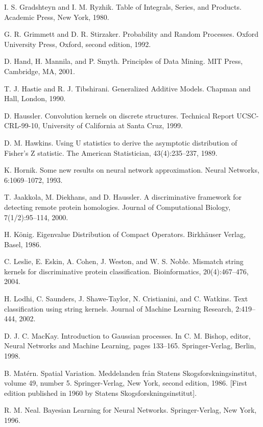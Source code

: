 \documentclass[11pt]{book}
\begin{document}
\begin{thebibliography}{99}
 I. S. Gradshteyn and I. M. Ryzhik. Table of Integrals, Series, and Products. Academic Press, New York, 1980.

 G. R. Grimmett and D. R. Stirzaker. Probability and Random Processes. Oxford University Press, Oxford, second edition, 1992.

 D. Hand, H. Mannila, and P. Smyth. Principles of Data Mining. MIT Press, Cambridge, MA, 2001.

 T. J. Hastie and R. J. Tibshirani. Generalized Additive Models. Chapman and Hall, London, 1990.

 D. Haussler. Convolution kernels on discrete structures. Technical Report UCSC-CRL-99-10, University of California at Santa Cruz, 1999.

 D. M. Hawkins. Using U statistics to derive the asymptotic distribution of Fisher's Z statistic. The American Statistician, 43(4):235--237, 1989.

 K. Hornik. Some new results on neural network approximation. Neural Networks, 6:1069--1072, 1993.

 T. Jaakkola, M. Diekhans, and D. Haussler. A discriminative framework for detecting remote protein homologies. Journal of Computational Biology, 7(1/2):95--114, 2000.

 H. König. Eigenvalue Distribution of Compact Operators. Birkhäuser Verlag, Basel, 1986.

 C. Leslie, E. Eskin, A. Cohen, J. Weston, and W. S. Noble. Mismatch string kernels for discriminative protein classification. Bioinformatics, 20(4):467--476, 2004.

 H. Lodhi, C. Saunders, J. Shawe-Taylor, N. Cristianini, and C. Watkins. Text classification using string kernels. Journal of Machine Learning Research, 2:419--444, 2002.

 D. J. C. MacKay. Introduction to Gaussian processes. In C. M. Bishop, editor, Neural Networks and Machine Learning, pages 133--165. Springer-Verlag, Berlin, 1998.

 B. Matérn. Spatial Variation. Meddelanden från Statens Skogsforskningsinstitut, volume 49, number 5. Springer-Verlag, New York, second edition, 1986. [First edition published in 1960 by Statens Skogsforskningsinstitut].

 R. M. Neal. Bayesian Learning for Neural Networks. Springer-Verlag, New York, 1996.


\end{thebibliography}
\end{document}
